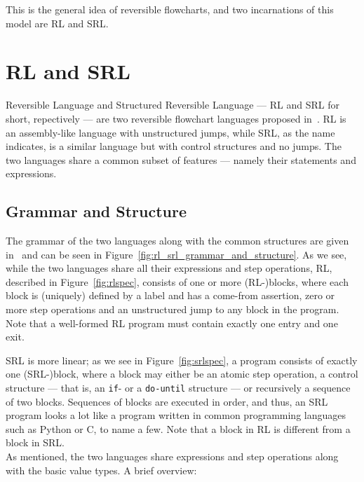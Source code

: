 
\noindent This is the general idea of reversible flowcharts, and two incarnations of this model are RL and SRL.\



\section*{RL and SRL}
\noindent Reversible Language and Structured Reversible Language --- RL and SRL for short, repectively --- are two reversible flowchart languages proposed in~\cite{REV}. RL is an assembly-like language with unstructured jumps, while SRL, as the name indicates, is a similar language but with control structures and no jumps. The two languages share a common subset of features --- namely their statements and expressions.

\subsection*{Grammar and Structure}

The grammar of the two languages along with the common structures are given in~\cite{REV} and can be seen in Figure~\ref{fig:rl_srl_grammar_and_structure}. As we see, while the two languages share all their expressions and step operations, RL, described in Figure~\ref{fig:rlspec}, consists of one or more (RL-)blocks, where each block is (uniquely) defined by a label and has a come-from assertion, zero or more step operations and an unstructured jump to any block in the program. Note that a well-formed RL program must contain exactly one entry and one exit.

SRL is more linear; as we see in Figure~\ref{fig:srlspec}, a program consists of exactly one (SRL-)block, where a block may either be an atomic step operation, a control structure --- that is, an \texttt{if}- or a \texttt{do-until} structure --- or recursively a sequence of two blocks. Sequences of blocks are executed in order, and thus, an SRL program looks a lot like a program written in common programming languages such as Python or C, to name a few. Note that a block in RL is different from a block in SRL.\\

\noindent As mentioned, the two languages share expressions and step operations along with the basic value types. A brief overview:

